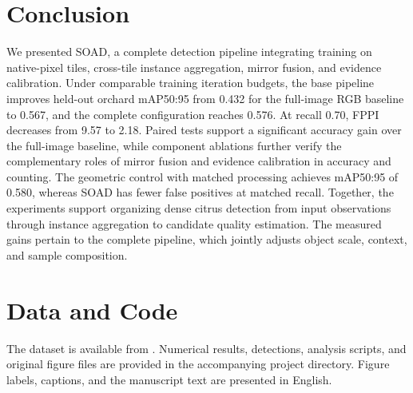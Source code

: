 \documentclass[11pt,a4paper]{article}
\begin{document}
\section{Conclusion}
We presented SOAD, a complete detection pipeline integrating training on native-pixel tiles, cross-tile instance aggregation, mirror fusion, and evidence calibration. Under comparable training iteration budgets, the base pipeline improves held-out orchard mAP50:95 from 0.432 for the full-image RGB baseline to 0.567, and the complete configuration reaches 0.576. At recall 0.70, FPPI decreases from 9.57 to 2.18. Paired tests support a significant accuracy gain over the full-image baseline, while component ablations further verify the complementary roles of mirror fusion and evidence calibration in accuracy and counting. The geometric control with matched processing achieves mAP50:95 of 0.580, whereas SOAD has fewer false positives at matched recall. Together, the experiments support organizing dense citrus detection from input observations through instance aggregation to candidate quality estimation. The measured gains pertain to the complete pipeline, which jointly adjusts object scale, context, and sample composition.

\section*{Data and Code}
The dataset is available from \cite{dataset}. Numerical results, detections, analysis scripts, and original figure files are provided in the accompanying project directory. Figure labels, captions, and the manuscript text are presented in English.
\end{document}

